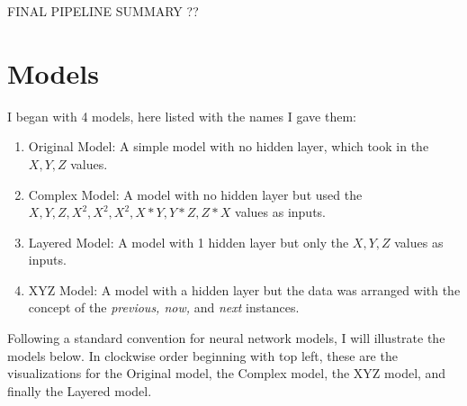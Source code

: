 \documentclass[]{report}
\begin{document}
FINAL PIPELINE SUMMARY ??

\section{Models}

I began with 4 models, here listed with the names I gave them:
\begin{enumerate}
	\item Original Model: A simple model with no hidden layer, which took in the $X,Y,Z$ values.
	\item Complex Model: A model with no hidden layer but used the $X,Y,Z,X^{2},X^{2},X^{2},X*Y,Y*Z,Z*X$ values as inputs.
	\item Layered Model: A model with 1 hidden layer but only the $X,Y,Z$ values as inputs.
	\item XYZ Model: A model with a hidden layer but the data was arranged with the concept of the \textit{previous, now,} and \textit{next} instances.\\
\end{enumerate}

Following a standard convention for neural network models, I will illustrate the models below.
In clockwise order beginning with top left, these are the visualizations for the Original model, the Complex model, the XYZ model, and finally the Layered model.
\end{document}
